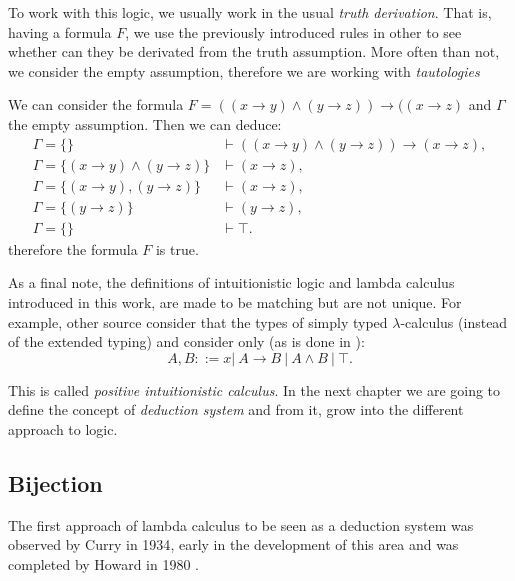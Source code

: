 To work with this logic, we usually work in the usual \emph{truth derivation}. That is, having a formula $F$, we use the previously introduced rules in other to see whether can they be derivated from the truth assumption. More often than not, we consider the empty assumption, therefore we are working with \emph{tautologies}

\begin{example}
  We can consider the formula $F=((x\to y) \land (y\to z)) \to ((x \to z)$ and $\Gamma$ the empty assumption. Then we can deduce:
  \begin{align*}
    \Gamma=\{\}& \vdash    ((x\to y) \land (y\to z)) \to (x\to z),\\
    \Gamma=\{(x\to y)\land (y\to z)\} & \vdash    (x \to z),\\
    \Gamma=\{(x\to y), (y\to z)\} & \vdash    (x \to z),\\
    \Gamma=\{ (y\to z)\} & \vdash    (y \to z),\\
    \Gamma=\{\} & \vdash \top.
    \end{align*}
therefore the formula $F$ is true.
\end{example}





As a final note, the definitions of intuitionistic logic and lambda calculus introduced in this work, are made to be matching but are not unique. For example, other source consider that the types of simply typed $\lambda$-calculus (instead of the extended typing) and consider only (as is done in \cite[Section 6.5]{selinger2008lecture}):
$$A,B ::= x |\ A\to B\ |\ A \land B \ |\ \top .$$

This is called \emph{positive intuitionistic calculus}. In the next chapter we are going to define the concept of \emph{deduction system} and from it, grow into the different approach to logic.



\subsection{Bijection}
The first approach of lambda calculus to be seen as a deduction system was observed by Curry in 1934\cite{curry1934functionality}, early in the development of this area and was completed by Howard in 1980 \cite{howard1980formulae}. \\%


